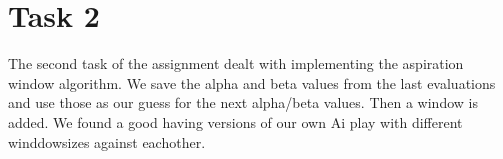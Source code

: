 \section{Task 2}
The second task of the assignment dealt with implementing the aspiration window algorithm. We save the alpha and beta values from the last evaluations and use those as our guess for the next alpha/beta values. Then a window is added. We found a good having versions of our own Ai play with different winddowsizes against eachother.  